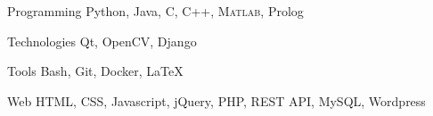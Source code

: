 

\begin{minipage}[]{0.4\textwidth}
  \vspace{2.0mm}

  \begin{cvskills}
    \cvskill
      {Programming}
      {Python, Java, C, C++, \textsc{Matlab}, Prolog}

    \cvskill
      {Technologies}
      {Qt, OpenCV, Django}

    \cvskill
      {Tools}
      {Bash, Git, Docker, \LaTeX}

    \cvskill
      {Web}
      {HTML, CSS, Javascript, jQuery, PHP, REST API, MySQL, Wordpress}
  \end{cvskills}
\end{minipage}%
\begin{minipage}[]{0.6\textwidth}
  \hfill
\end{minipage}


